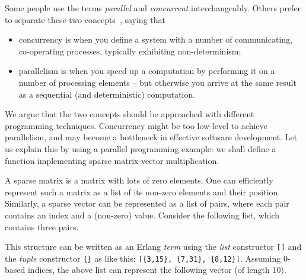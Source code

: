 Some people use the terms \emph{parallel} and \emph{concurrent}
interchangeably. Others prefer to separate these two concepts~\cite{marlow},
saying that

\begin{itemize}
\itemsep1pt\parskip0pt
\item
  concurrency is when you define a system with a number of
  communicating, co-operating processes, typically exhibiting
  non-determinism;
\item
  parallelism is when you speed up a computation by performing it on a
  number of processing elements -- but otherwise you arrive at the same
  result as a sequential (and deterministic) computation.
\end{itemize}

We argue that the two concepts should be approached with different
programming techniques. Concurrency might be too low-level to achieve
parallelism, and may become a bottleneck in effective software
development. Let us explain this by using a parallel programming
example: we shall define a function implementing sparse matrix-vector
multiplication.


A sparse matrix is a matrix with lots of zero elements. One
can efficiently represent such a matrix as a list of its non-zero
elements and their position. Similarly, a sparse vector can be
represented as a list of pairs, where each pair contains an index and a
(non-zero) value. Consider the following list, which contains three pairs.

\begin{figure}[htbp]
\centering

\end{figure}

This structure can be written as an Erlang \emph{term} 
using the \emph{list} constructor \lstinline[language=myerlang]{[]} and 
the \emph{tuple} constructor \lstinline[language=myerlang]|{}| as
like this: %
\lstinline[language=myerlang]|[{3,15}, {7,31}, {8,12}]|.
Assuming 0-based indices, the above list can represent the following
vector (of length 10).

\begin{figure}[htbp]
\centering

\end{figure}

